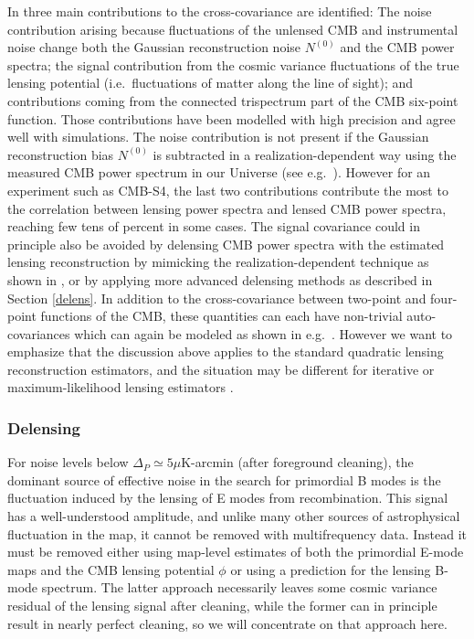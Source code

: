 In \cite{Schmittfull:2013uea} three main contributions to the cross-covariance are identified: The noise contribution arising because fluctuations of the unlensed CMB and instrumental noise change both the Gaussian reconstruction noise $N^{(0)}$ and the CMB power spectra;
the signal contribution from the cosmic variance fluctuations of the true lensing potential (i.e.~fluctuations of matter along the line of sight); and contributions coming from the connected trispectrum part of the CMB six-point function.
Those contributions have been modelled with high precision and agree well with simulations.
The noise contribution is not present if the Gaussian reconstruction bias $N^{(0)}$ is subtracted in a realization-dependent way using the measured CMB power spectrum in our Universe (see e.g.~\cite{Hanson:2010rp,Schmittfull:2013uea}).
However for an experiment such as CMB-S4, the last two contributions contribute the most to the correlation between lensing power spectra and lensed CMB power spectra, reaching few tens of percent in some cases.
The signal covariance could in principle also be avoided by delensing CMB power spectra with the estimated lensing reconstruction by mimicking the realization-dependent technique as shown in \cite{Schmittfull:2013uea}, or by applying more advanced delensing methods as described in Section \ref{delens}.
In addition to the cross-covariance between two-point and four-point functions of the CMB, these quantities can each have non-trivial auto-covariances which can again be modeled as shown in e.g.~\cite{Smith:2005ue,Smith:2006nk,Li:2006pu,BenoitLevy:2012va,Schmittfull:2013uea}. 
However we want to emphasize that the discussion above applies to the standard quadratic lensing reconstruction estimators, and the situation may be different for iterative or maximum-likelihood lensing estimators \cite{Hirata:2002jy}.

\subsubsection{Delensing}
For noise levels below $\Delta_P \simeq 5 \mu$K-arcmin (after foreground cleaning),  the dominant source of effective noise in the search for primordial B modes is the fluctuation induced by the lensing of E modes from recombination.  This signal has a well-understood amplitude, and unlike many other sources of astrophysical fluctuation in the map, it cannot be removed with multifrequency data.  Instead it must be removed either using map-level estimates of both the primordial E-mode maps and the CMB lensing potential $\phi$ or using a prediction for the lensing B-mode spectrum. The latter approach necessarily leaves some cosmic variance residual of the lensing signal after cleaning, while the former can in principle result in nearly perfect cleaning, so we will concentrate on that approach here.

